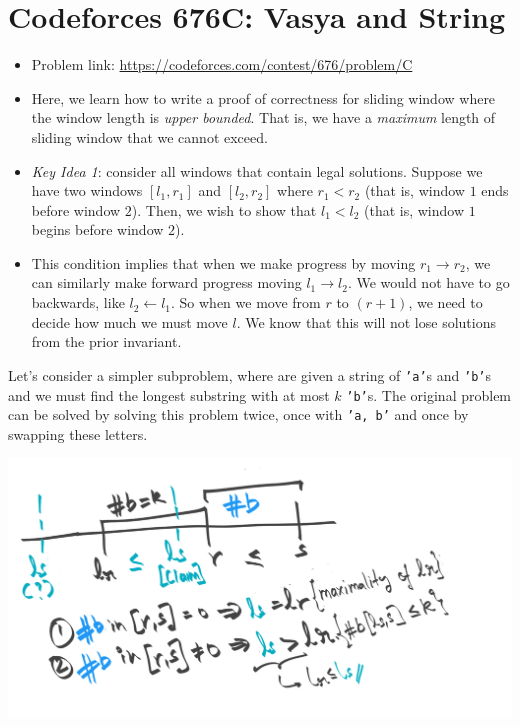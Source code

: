 \section{Codeforces 676C: Vasya and String}
\begin{itemize}
    \item Problem link: \url{https://codeforces.com/contest/676/problem/C}
    \item Here, we learn how to write a proof of correctness for sliding window where the window length is \emph{upper bounded}. That is,
        we have a \emph{maximum} length of sliding window that we cannot exceed.
    \item \emph{Key Idea 1}: consider all windows that contain legal solutions. Suppose we have two windows $[l_1, r_1]$ and $[l_2, r_2]$
        where $r_1 < r_2$ (that is, window $1$ ends before window $2$). Then, we wish to show that $l_1 < l_2$ (that is, window $1$
        begins before window $2$).
    \item This condition implies that when we make progress by moving $r_1 \rightarrow r_2$, we can similarly make forward progress
      moving $l_1 \rightarrow l_2$. We would not have to go backwards, like
      $l_2 \leftarrow l_1$.  So when we move from $r$ to $(r+1)$, we need to
      decide how much we must move $l$. We know that this will not lose
      solutions from the prior invariant.
\end{itemize}


Let's consider a simpler subproblem, where are given a string of \texttt{'a'}s and \texttt{'b'}s and we must find
the longest substring with at most $k$ \texttt{'b'}s. The original problem can be solved by solving this problem twice,
once with \texttt{'a, b'} and once by swapping these letters.

\includegraphics[width=\textwidth]{problems/676c/sliding-window-optimality.png}

